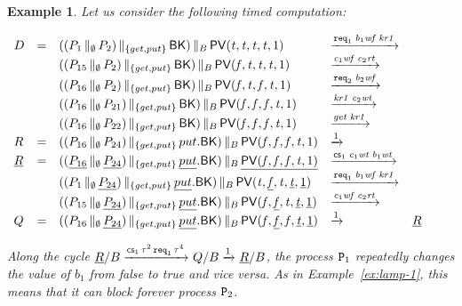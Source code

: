 \documentclass[copyright,creativecommons]{eptcs}
\newenvironment{tracex}{\ccspace{0.15}\noindent}{\ccspace{0.2}}
\newcommand{\ccspace}[1]{\vspace{#1cm}}
\newtheorem{example}[theorem]{Example}
\newcommand{\nar}[2]{\xrightarrow{#1}_{#2}}
\newcommand{\fa}{\mathit{f}}
\newcommand{\tr}{\mathit{t}}
\newcommand{\wtb}[1]{{\it b_{{\rm #1}}wt}}
\newcommand{\wfb}[1]{{\it b_{{\rm #1}}wf}}
\newcommand{\wtc}[1]{{\it c_{{\rm #1}}wt}}
\newcommand{\wfc}[1]{{\it c_{{\rm #1}}wf}}
\newcommand{\rtc}[1]{{\it c_{{\rm #1}}rt}}
\newcommand{\rk}[1]{{\it kr #1}}
\newcommand{\vp}{{\sf PV}}
\newcommand{\req}{{\tt req}}
\newcommand{\cs}{{\sf cs}}
\newcommand{\BK}{{\sf BK}}
\newcommand{\proc}{{\tt P}}
\newcommand{\ppath}[5]{#1 & #2 & #3 & #4 & #5}
\begin{document}
\begin{example}\rm\label{ex:dijkstra1}
Let us consider the following timed computation:

\begin{tracex}
$\begin{array}{l l l l l}
\ppath{D}{=}{((P_1 \,\|_\emptyset \, P_2) \,\|_{\{get, put\}}\, \BK)
\,\|_B\, \vp(\tr, \tr, \tr, \tr,1)}{\nar{ \req_1 \; \wfb{1} \; \rk{1}
}{}}{}\\
\ppath{}{}{((P_{15} \,\|_\emptyset\, P_2) \,\|_{\{get, put\}}\, \BK)
\,\|_B\, \vp(\fa, \tr, \tr, \tr,1)}{\nar{ \wfc{1} \; \rtc{2} }{}}{}\\
\ppath{}{}{((P_{16} \,\|_\emptyset\, P_2) \,\|_{\{get, put\}}\, \BK)
\,\|_B\, \vp(\fa, \tr, \fa, \tr,1)}{\nar{ \req_2 \; \wfb{2} }{}}{}\\
\ppath{}{}{((P_{16} \,\|_\emptyset\, P_{21}) \,\|_{\{get, put\}}\, \BK)
\,\|_B\, \vp(\fa, \fa, \fa, \tr,1)}{\nar{ \rk{1} \; \wtc{2} }{}}{}\\
\ppath{}{}{((P_{16} \,\|_\emptyset\, P_{22}) \,\|_{\{get, put\}}\, \BK)
\,\|_B\, \vp(\fa, \fa, \fa, \tr,1)}{\nar{ get \; \rk{1} }{}}{}\\
\ppath{R}{=}{((P_{16} \,\|_\emptyset\, P_{24}) \,\|_{\{get, put\}}\,
put.\BK) \,\|_B\, \vp(\fa, \fa, \fa, \tr,1)}{\nar{ 1 }{}}{}\\
\ppath{\underline{R}}{=}{((\underline{P_{16}} \,\|_\emptyset\,
\underline{P_{24}}) \,\|_{\{get, put\}}\, \underline{put}.\BK) \,\|_B\,
\underline{\vp(\fa, \fa, \fa, \tr,1)}}{\nar{ \cs_1 \; \wtc{1} \; \wtb{1}
}{}}{}\\
\ppath{}{}{((P_{1} \,\|_\emptyset\, \underline{P_{24}}) \,\|_{\{get,
put\}}\, \underline{put}.\BK) \,\|_B\, \vp(\tr, \underline{\fa}, \tr,
\underline{\tr}, \underline{1})}{\nar{ \req_1 \; \wfb{1} \; \rk{1}}{}}{}\\
\ppath{}{}{((P_{15} \,\|_\emptyset\, \underline{P_{24}}) \,\|_{\{get,
put\}}\, \underline{put}.\BK) \,\|_B\, \vp(\fa, \underline{\fa}, \tr,
\underline{\tr}, \underline{1})}{\nar{ \wfc{1} \; \rtc{2} } {}}{}\\
\ppath{Q}{=}{((P_{16} \,\|_\emptyset\, \underline{P_{24}}) \,\|_{\{get,
put\}}\, \underline{put}.\BK) \,\|_B\, \vp(\fa, \underline{\fa}, \fa,
\underline{\tr}, \underline{1})}{\nar{ 1 } {}}{ \underline{R}}\\
\end{array}$
\end{tracex}

Along the cycle $\underline{R}/B \nar{ \cs_1 \, \tau^2 \, \req_1 \,
\tau^4}{} Q/B \nar{1}{} \underline{R}/B$, the process $\proc_1$ repeatedly
changes the value of $b_1$  from {\em false} to {\em true} and vice versa.
As in Example~\ref{ex:lamp-1}, this means that it can block forever process
$\proc_2$.
\end{example}
\end{document}

